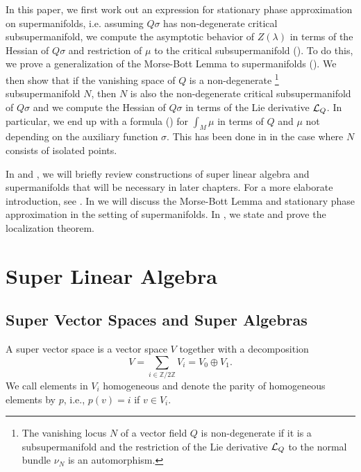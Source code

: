 \documentclass[11pt]{amsart}
\numberwithin{equation}{section}
\numberwithin{figure}{section}
\theoremstyle{plain}
\theoremstyle{definition}
\theoremstyle{remark}
\begin{document}
In this paper, we first work out an expression for stationary phase
approximation on supermanifolds, i.e. assuming $Q\sigma$ has non-degenerate
critical subsupermanifold, we compute the asymptotic behavior of $Z(\lambda)$
in terms of the Hessian of $Q\sigma$ and restriction of $\mu$ to
the critical subsupermanifold ().
To do this, we prove a generalization of the Morse-Bott Lemma to supermanifolds
(). We then show that if the vanishing
space of $Q$ is a non-degenerate%
\footnote{The vanishing locus $N$ of a vector field $Q$ is non-degenerate
if it is a subsupermanifold and the restriction of the Lie derivative
$\mathcal{L}_{Q}$ to the normal bundle $\nu_{N}$ is an automorphism. %
} subsupermanifold $N$, then $N$ is also the non-degenerate critical
subsupermanifold of $Q\sigma$ and we compute the Hessian of $Q\sigma$
in terms of the Lie derivative $\mathcal{L}_{Q}$. In particular, we end up
with a formula () for $\int_{M}\mu$
in terms of $Q$ and $\mu$ not depending on the auxiliary function
$\sigma$. This has been done in \cite{SuppersymmetryAndLocalization}
in the case where $N$ consists of isolated points. 

In  and ,
we will briefly review constructions of super linear algebra and supermanifolds
that will be necessary in later chapters. For a more elaborate introduction,
see \cite{NotesOnSuperSymmetry,Leites1980,GaugeFieldTheory}. In 
we will discuss the Morse-Bott Lemma and stationary phase approximation
in the setting of supermanifolds. In ,
we state and prove the localization theorem.


\section{Super Linear Algebra\label{sec:Super-Linear-Algebra}}


\subsection{Super Vector Spaces and Super Algebras}

A super vector space is a vector space $V$ together with a decomposition
\[
V=\sum_{i\in\mathbb{Z}/2\mathbb{Z}}V_{i}=V_{0}\oplus V_{1}.
\]
We call elements in $V_{i}$ homogeneous and denote the parity of
homogeneous elements by $p$, i.e., $p(v)=i$ if $v\in V_{i}$. 
\end{document}
